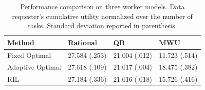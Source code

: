 \begin{table}[t]
\caption{Performance comparison on three worker models. Data requester's cumulative utility normalized over the number of tasks. Standard deviation reported in parenthesis.}
\label{table:performance}
\vskip 0.1in
\centering
{\scriptsize
\begin{sc}
\begin{tabular}{ l | l | l | l }
\hline
Method & Rational & QR & MWU \\ \hline \hline
Fixed Optimal & 27.584 (.253) & 21.004 (.012) & 11.723 (.514) \\
Adaptive Optimal & 27.618 (.109) & 21.017 (.004) & 18.475 (.382) \\
\hline
RIL & 27.184 (.336) & 21.016 (.018) & 15.726 (.416)\\
\hline
\end{tabular}
\end{sc}
}
\vskip -0.1in
\end{table}




